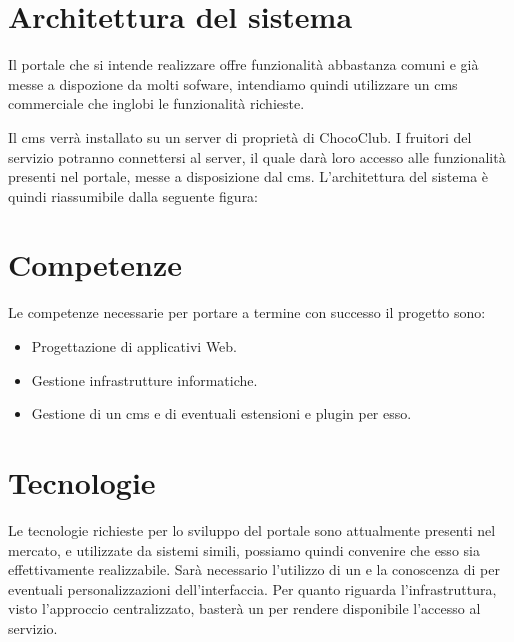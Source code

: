 \section{Architettura del sistema} 
\label{sec:architettura_sistema}
Il portale che si intende realizzare offre funzionalità abbastanza comuni e già messe a dispozione da molti sofware, intendiamo quindi utilizzare un \gls{cms} commerciale che inglobi le funzionalità richieste.

Il \gls{cms} verrà installato su un server di proprietà di ChocoClub.
I fruitori del servizio potranno connettersi al server, il quale darà loro accesso alle funzionalità presenti nel portale, messe a disposizione dal \gls{cms}.
L'architettura del sistema è quindi riassumibile dalla seguente figura:

\section{Competenze} 
\label{sec:competenze}
Le competenze necessarie per portare a termine con successo il progetto sono:
\begin{itemize}
	\item Progettazione di applicativi Web.
	\item Gestione infrastrutture informatiche.
	\item Gestione di un \gls{cms} e di eventuali estensioni e plugin per esso.
\end{itemize}

\section{Tecnologie}
\label{sec:tecnologie}
Le tecnologie richieste per lo sviluppo del portale sono attualmente presenti nel mercato, e utilizzate da sistemi simili, possiamo quindi convenire che esso sia effettivamente realizzabile.
Sarà necessario l'utilizzo di un  e la conoscenza di  per eventuali personalizzazioni dell'interfaccia.
Per quanto riguarda l'infrastruttura, visto l'approccio centralizzato, basterà un  per rendere disponibile l'accesso al servizio.



